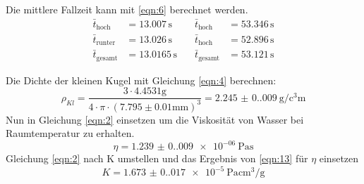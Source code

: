 Die mittlere Fallzeit kann mit \ref{eqn:6} berechnet werden.\\
\begin{align}
  \bar{t}_{\text{hoch}} &= 13.007\,\unit{\second}  \quad &\bar{t}_{\text{hoch}} &= 53.346\,\unit{\second}\\
  \bar{t}_{\text{runter}} &= 13.026\,\unit{\second}  \quad &\bar{t}_{\text{hoch}} &= 52.896\,\unit{\second}\\
  \bar{t}_{\text{gesamt}} &= 13.0165\,\unit{\second}  \quad &\bar{t}_{\text{gesamt}} &= 53.121\,\unit{\second}
\end{align}

Die Dichte der kleinen Kugel mit Gleichung \ref{eqn:4} berechnen:
\begin{equation}
  ρ_{Kl} = \frac{3 \cdot 4.4531 \unit{\gram}}{4 \cdot π \cdot (7.795 \pm 0.01 \unit{\milli\meter})^3} = \SI{2.245(0.009)}{\g\per\cubic\centi\metre}
\end{equation}\label{eqn:13}
\noindent Nun in Gleichung \eqref{eqn:2} einsetzen um die Viskosität von Wasser bei Raumtemperatur zu erhalten.
\begin{equation}
  η = \SI{1.239(0.009)e-06}{\pascal\s}
\end{equation}
Gleichung \ref{eqn:2} nach K umstellen und das Ergebnis von \ref{eqn:13} für $η$ einsetzen
\begin{equation}
  K = \SI{1.673(0.017)e-5}{\pascal\centi\cubic\meter\per\gram}
\end{equation}
\newpage

